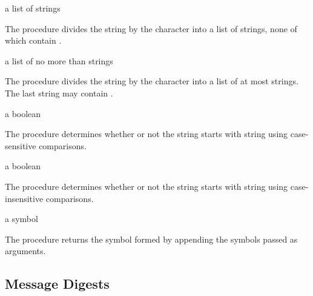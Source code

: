 \begin{procedure}
\end{procedure}
\returns{} a list of strings

The  procedure divides the  string by the
 character into a list of strings, none of which
contain .

\begin{procedure}
\end{procedure}
\returns{} a list of no more than  strings

The  procedure divides the  string by the
 character into a list of at most  strings. The
last string may contain .

\begin{procedure}
\end{procedure}
\returns{} a boolean

The  procedure determines whether or not the string
 starts with string  using case-sensitive comparisons.

\begin{procedure}
\end{procedure}
\returns{} a boolean

The  procedure determines whether or not the
string  starts with string  using case-insensitive
comparisons.

\begin{procedure}
\end{procedure}
\returns{} a symbol

The  procedure returns the symbol formed by
appending the symbols passed as arguments.

\subsection {Message Digests}

